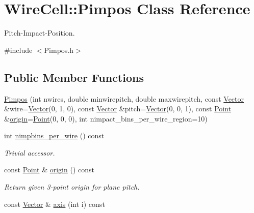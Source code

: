 \hypertarget{class_wire_cell_1_1_pimpos}{}\section{Wire\+Cell\+:\+:Pimpos Class Reference}
\label{class_wire_cell_1_1_pimpos}


Pitch-\/\+Impact-\/\+Position.  




{\ttfamily \#include $<$Pimpos.\+h$>$}

\subsection*{Public Member Functions}
\begin{DoxyCompactItemize}
\item 
\hyperlink{class_wire_cell_1_1_pimpos_a3cced28a957f1b3f9610166e29441934}{Pimpos} (int nwires, double minwirepitch, double maxwirepitch, const \hyperlink{namespace_wire_cell_aa3c82d3ba85f032b0d278b7004846800}{Vector} \&wire=\hyperlink{namespace_wire_cell_aa3c82d3ba85f032b0d278b7004846800}{Vector}(0, 1, 0), const \hyperlink{namespace_wire_cell_aa3c82d3ba85f032b0d278b7004846800}{Vector} \&pitch=\hyperlink{namespace_wire_cell_aa3c82d3ba85f032b0d278b7004846800}{Vector}(0, 0, 1), const \hyperlink{namespace_wire_cell_ab2b2565fa6432efbb4513c14c988cda9}{Point} \&\hyperlink{class_wire_cell_1_1_pimpos_a9e7fe5e650d32ca5bc66bf69123e83f0}{origin}=\hyperlink{namespace_wire_cell_ab2b2565fa6432efbb4513c14c988cda9}{Point}(0, 0, 0), int nimpact\+\_\+bins\+\_\+per\+\_\+wire\+\_\+region=10)
\item 
int \hyperlink{class_wire_cell_1_1_pimpos_a2728ed20a76edaab2b09f7cfacf5d99b}{nimpbins\+\_\+per\+\_\+wire} () const
\begin{DoxyCompactList}\small\item\em Trivial accessor. \end{DoxyCompactList}\item 
const \hyperlink{namespace_wire_cell_ab2b2565fa6432efbb4513c14c988cda9}{Point} \& \hyperlink{class_wire_cell_1_1_pimpos_a9e7fe5e650d32ca5bc66bf69123e83f0}{origin} () const
\begin{DoxyCompactList}\small\item\em Return given 3-\/point origin for plane pitch. \end{DoxyCompactList}\item 
const \hyperlink{namespace_wire_cell_aa3c82d3ba85f032b0d278b7004846800}{Vector} \& \hyperlink{class_wire_cell_1_1_pimpos_a0eed2ce13249e92b343e94e0ecaa3953}{axis} (int i) const

\end{DoxyCompactItemize}
